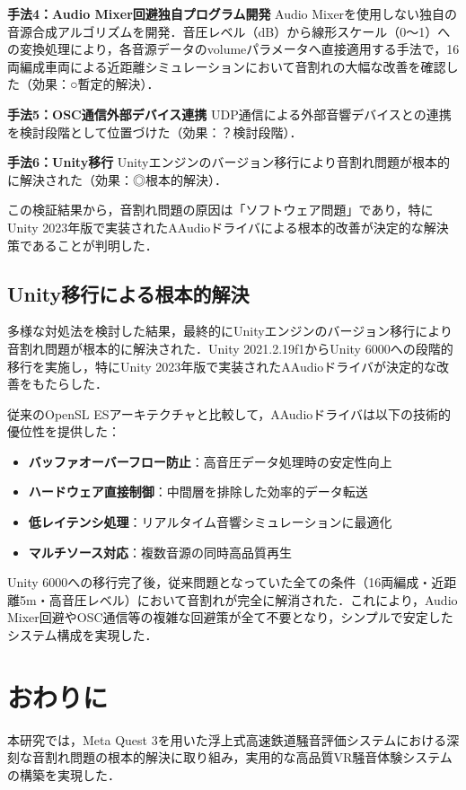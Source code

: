 \documentclass[10pt]{jsarticle}
\begin{document}
\textbf{手法4：Audio Mixer回避独自プログラム開発}
Audio Mixerを使用しない独自の音源合成アルゴリズムを開発．音圧レベル（dB）から線形スケール（0〜1）への変換処理により，各音源データのvolumeパラメータへ直接適用する手法で，16両編成車両による近距離シミュレーションにおいて音割れの大幅な改善を確認した（効果：○暫定的解決）．

\textbf{手法5：OSC通信外部デバイス連携}
UDP通信による外部音響デバイスとの連携を検討段階として位置づけた（効果：？検討段階）．

\textbf{手法6：Unity移行}
Unityエンジンのバージョン移行により音割れ問題が根本的に解決された（効果：◎根本的解決）．

この検証結果から，音割れ問題の原因は「ソフトウェア問題」であり，特にUnity 2023年版で実装されたAAudioドライバによる根本的改善が決定的な解決策であることが判明した．

\subsection{Unity移行による根本的解決}
多様な対処法を検討した結果，最終的にUnityエンジンのバージョン移行により音割れ問題が根本的に解決された．Unity 2021.2.19f1からUnity 6000への段階的移行を実施し，特にUnity 2023年版で実装されたAAudioドライバが決定的な改善をもたらした．

従来のOpenSL ESアーキテクチャと比較して，AAudioドライバは以下の技術的優位性を提供した：
\begin{itemize}
\item \textbf{バッファオーバーフロー防止}：高音圧データ処理時の安定性向上
\item \textbf{ハードウェア直接制御}：中間層を排除した効率的データ転送
\item \textbf{低レイテンシ処理}：リアルタイム音響シミュレーションに最適化
\item \textbf{マルチソース対応}：複数音源の同時高品質再生
\end{itemize}

Unity 6000への移行完了後，従来問題となっていた全ての条件（16両編成・近距離5m・高音圧レベル）において音割れが完全に解消された．これにより，Audio Mixer回避やOSC通信等の複雑な回避策が全て不要となり，シンプルで安定したシステム構成を実現した．

\section{おわりに}
本研究では，Meta Quest 3を用いた浮上式高速鉄道騒音評価システムにおける深刻な音割れ問題の根本的解決に取り組み，実用的な高品質VR騒音体験システムの構築を実現した．
\end{document}
